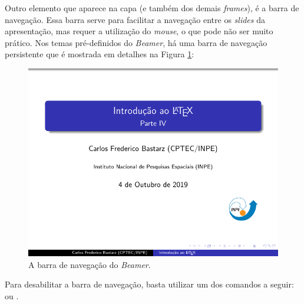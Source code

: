 Outro elemento que aparece na capa (e também dos demais \textit{frames}), é a barra de navegação. Essa barra serve para facilitar a navegação entre os \textit{slides} da apresentação, mas requer a utilização do \textit{mouse}, o que pode não ser muito prático. Nos temas pré-definidos do \textit{Beamer}, há uma barra de navegação persistente que é mostrada em detalhes na Figura \ref{fig:navbar}:

\begin{figure}[H]
\caption{A barra de navegação do \textit{Beamer}.}
\vspace{6mm}
  \begin{center}
    \includegraphics[trim={8cm 0.35cm 0 8.75cm}, clip, scale=3]{./docs/figs/beamer-capa.pdf}
  \end{center}
\vspace{4mm}
\label{fig:navbar}
\end{figure}

Para desabilitar a barra de navegação, basta utilizar um dos comandos a seguir: \texttt{\beamertemplatenavigationsymbolsempty} ou \texttt{}.


